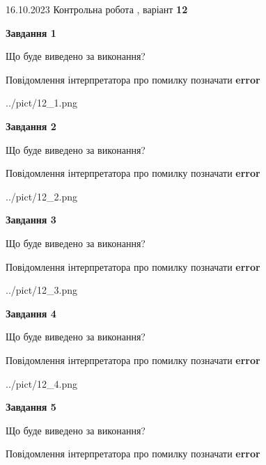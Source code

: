 \documentclass[12pt, ukrainian]{article}
\begin{document}
{\Large{16.10.2023 Контрольна робота , варіант  \No \textbf { 12 }\par}}
{
\begin {large}
{\begin {center}\textbf{Завдання 1}\end {center}}\par
Що буде виведено за виконання? \par
Повідомлення інтерпретатора про помилку позначати \textbf{error}

\begin{center}
	{../pict/12_1.png}
\end{center}
\newpage

{\begin {center}\textbf{Завдання 2}\end {center}}\par
Що буде виведено за виконання? \par
Повідомлення інтерпретатора про помилку позначати \textbf{error}

\begin{center}
	{../pict/12_2.png}
\end{center}
\newpage

{\begin {center}\textbf{Завдання 3}\end {center}}\par
Що буде виведено за виконання? \par
Повідомлення інтерпретатора про помилку позначати \textbf{error}

\begin{center}
	{../pict/12_3.png}
\end{center}
\newpage

{\begin {center}\textbf{Завдання 4}\end {center}}\par
Що буде виведено за виконання? \par
Повідомлення інтерпретатора про помилку позначати \textbf{error}

\begin{center}
	{../pict/12_4.png}
\end{center}
\newpage

{\begin {center}\textbf{Завдання 5}\end {center}}\par
Що буде виведено за виконання? \par
Повідомлення інтерпретатора про помилку позначати \textbf{error}


\end{large}}
\end{document}
